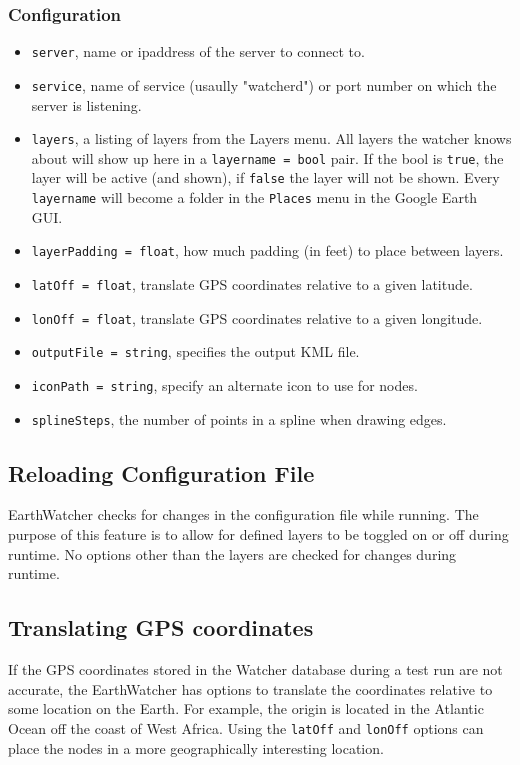 \subsubsection{Configuration}
\begin{itemize}
\item {\tt server}, name or ipaddress of the server to connect to.
\item {\tt service}, name of service (usaully "watcherd") or port number on which the server is listening.
\item {\tt layers}, a listing of layers from the Layers menu. All layers the watcher knows about will show up here in a {\tt layername = bool} pair. 
If the bool is {\tt true}, the layer will be active (and shown), if {\tt false} the layer will not be shown. Every {\tt layername} will become
a folder in the {\tt Places} menu in the Google Earth GUI.
\item {\tt layerPadding = float}, how much padding (in feet) to place between layers. 
\item {\tt latOff = float}, translate GPS coordinates relative to a given latitude.
\item {\tt lonOff = float}, translate GPS coordinates relative to a given longitude.
\item {\tt outputFile = string}, specifies the output KML file.
\item {\tt iconPath = string}, specify an alternate icon to use for nodes.
\item {\tt splineSteps}, the number of points in a spline when drawing edges.
\end{itemize}

\subsection{Reloading Configuration File}

EarthWatcher checks for changes in the configuration file while running.  The purpose of this feature is to allow for
defined layers to be toggled on or off during runtime.  No options other than the layers are checked for changes during runtime.

\subsection{Translating GPS coordinates}

If the GPS coordinates stored in the Watcher database during a test run are not
accurate, the EarthWatcher has options to translate the coordinates relative to
some location on the Earth.  For example, the origin is located in the Atlantic
Ocean off the coast of West Africa.  Using the {\tt latOff} and {\tt lonOff}
options can place the nodes in a more geographically interesting location.
